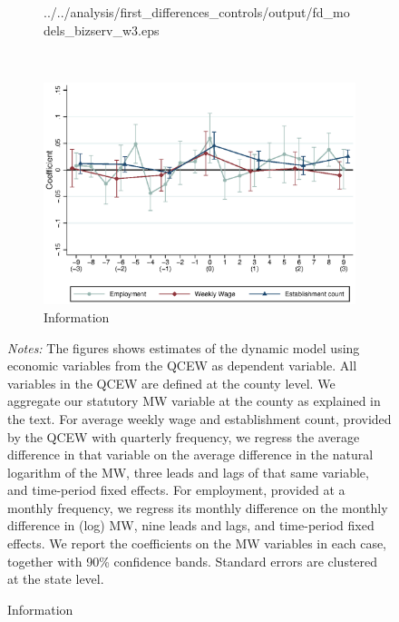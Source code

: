 \begin{figure}[htb!]
\begin{subfigure}[b]{.55\textwidth}
			{../../analysis/first_differences_controls/output/fd_models_bizserv_w3.eps}
	\end{subfigure}\\
	\begin{subfigure}[b]{.55\textwidth}
		\caption{Information}
		\includegraphics[width = \textwidth]
			{../../analysis/first_differences_controls/output/fd_models_info_w3.eps}
	\end{subfigure}
	\begin{minipage}{0.95\textwidth}\footnotesize
		\vspace{3mm}	
		\textit{Notes:} The figures shows estimates of the dynamic model using economic variables 
		from the QCEW as dependent variable. All variables in the QCEW are defined at the county level.
		We aggregate our statutory MW variable at the county as explained in the text. For average weekly 
		wage and establishment count, provided by the QCEW with quarterly frequency, we regress the average 
		difference in that variable on the average difference in the natural logarithm of the MW, three 
		leads and lags of that	same variable, and time-period fixed effects. For employment, provided at a 
		monthly frequency, we regress its monthly difference on the monthly difference in (log) MW, nine 
		leads and lags, and time-period fixed effects. We report the coefficients on the MW variables in 
		each case, together with 90\% confidence bands. Standard errors are clustered at the state level.
	\end{minipage}
\end{figure}



